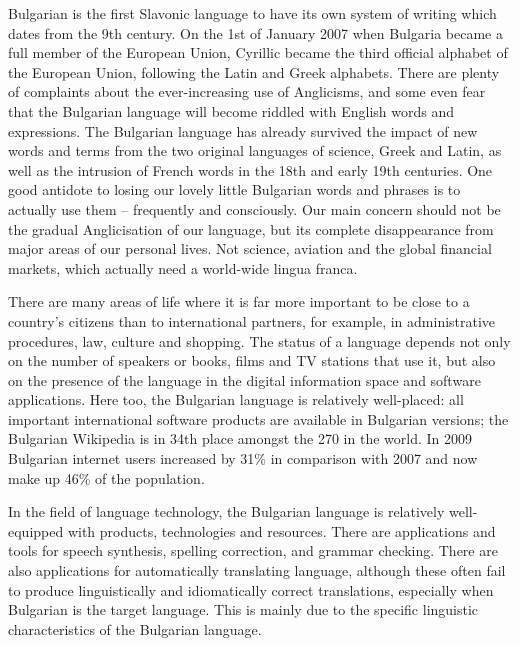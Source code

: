 \begin{multicols}{2}
Bulgarian is the first Slavonic language to have its own system of writing which dates from the 9th century. On the 1st of January 2007 when Bulgaria became a full member of the European Union, Cyrillic became the third official alphabet of the European Union, following the Latin and Greek alphabets. 
There are plenty of complaints about the ever-increasing use of Anglicisms, and some even fear that the Bulgarian language will become riddled with English words and expressions. The Bulgarian language has already survived the impact of new words and terms from the two original languages of science, Greek and Latin, as well as the intrusion of French words in the 18th and early 19th centuries. One good antidote to losing our lovely little Bulgarian words and phrases is to actually use them -- frequently and consciously. Our main concern should not be the gradual Anglicisation of our language, but its complete disappearance from major areas of our personal lives. Not science, aviation and the global financial markets, which actually need a world-wide lingua franca.

There are many areas of life where it is far more important to be close to a country’s citizens than to international partners, for example, in administrative procedures, law, culture and shopping. The status of a language depends not only on the number of speakers or books, films and TV stations that use it, but also on the presence of the language in the digital information space and software applications.  Here too, the Bulgarian language is relatively well-placed: all important international software products are available in Bulgarian versions; the Bulgarian Wikipedia is in 34th place amongst the 270 in the world. In 2009 Bulgarian internet users increased by 31\% in comparison with 2007 and now make up 46\% of the population.

In the field of language technology, the Bulgarian language is relatively well-equipped with products, technologies and resources. There are applications and tools for speech synthesis, spelling correction, and grammar checking. There are also applications for automatically translating language, although these often fail to produce linguistically and idiomatically correct translations, especially when Bulgarian is the target language. This is mainly due to the specific linguistic characteristics of the Bulgarian language. 


\end{multicols}
